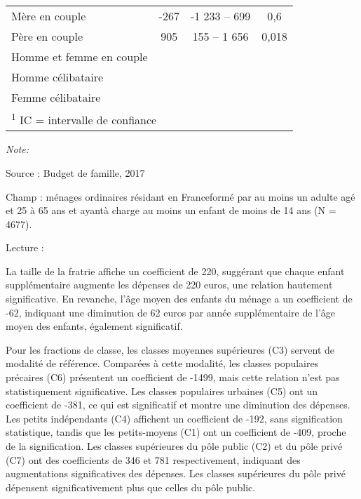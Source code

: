\documentclass[
  12pt,
]{book}
\begin{document}
\begin{table}[!h]
{\begin{threeparttable}
\begin{tabular}[t]{lccc}
\hspace{1em}Mère en couple & -267 & -1 233 – 699 & 0,6\\
\hspace{1em}Père en couple & 905 & 155 – 1 656 & 0,018\\
\hspace{1em}Homme et femme en couple &  &  & \\
\hspace{1em}Homme célibataire &  &  & \\
\addlinespace
\hspace{1em}Femme célibataire &  &  & \\
\bottomrule
\multicolumn{4}{l}{\rule{0pt}{1em}\textsuperscript{1} IC = intervalle de confiance}\\
\end{tabular}
\begin{tablenotes}
\item \textit{Note: } 
\item Source : Budget de famille, 2017
\item Champ : ménages ordinaires résidant en Franceformé par au moins un adulte agé et 25 à 65 ans et ayantà charge au moins un enfant de moins de 14 ans (N = 4677).
\item Lecture :  
\end{tablenotes}
\end{threeparttable}}
\end{table}

La taille de la fratrie affiche un coefficient de 220, suggérant que
chaque enfant supplémentaire augmente les dépenses de 220 euros, une
relation hautement significative. En revanche, l'âge moyen des enfants
du ménage a un coefficient de -62, indiquant une diminution de 62 euros
par année supplémentaire de l'âge moyen des enfants, également
significatif.

Pour les fractions de classe, les classes moyennes supérieures (C3)
servent de modalité de référence. Comparées à cette modalité, les
classes populaires précaires (C6) présentent un coefficient de -1499,
mais cette relation n'est pas statistiquement significative. Les classes
populaires urbaines (C5) ont un coefficient de -381, ce qui est
significatif et montre une diminution des dépenses. Les petits
indépendants (C4) affichent un coefficient de -192, sans signification
statistique, tandis que les petits-moyens (C1) ont un coefficient de
-409, proche de la signification. Les classes supérieures du pôle public
(C2) et du pôle privé (C7) ont des coefficients de 346 et 781
respectivement, indiquant des augmentations significatives des dépenses.
Les classes supérieures du pôle privé dépensent significativement plus
que celles du pôle public.
\end{document}
